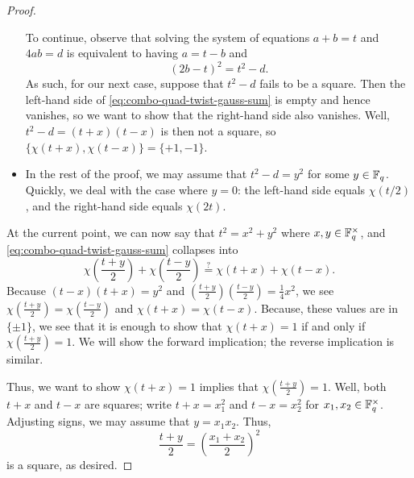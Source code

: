 \begin{proof}
\begin{itemize}
        To continue, observe that solving the system of equations $a+b=t$ and $4ab=d$ is equivalent to having $a=t-b$ and
        \[(2b-t)^2=t^2-d.\]
        As such, for our next case, suppose that $t^2-d$ fails to be a square. Then the left-hand side of \eqref{eq:combo-quad-twist-gauss-sum} is empty and hence vanishes, so we want to show that the right-hand side also vanishes. Well, $t^2-d=(t+x)(t-x)$ is then not a square, so $\{\chi(t+x),\chi(t-x)\}=\{+1,-1\}$.
        \item In the rest of the proof, we may assume that $t^2-d=y^2$ for some $y\in\mathbb F_q$. Quickly, we deal with the case where $y=0$: the left-hand side equals $\chi(t/2)$, and the right-hand side equals $\chi(2t)$.
    \end{itemize}
    At the current point, we can now say that $t^2=x^2+y^2$ where $x,y\in\mathbb F_q^\times$, and \eqref{eq:combo-quad-twist-gauss-sum} collapses into
    \begin{equation*}
        \chi\left(\frac{t+y}2\right)+\chi\left(\frac{t-y}2\right)\stackrel?=\chi(t+x)+\chi(t-x). \label{eq:last-combo-quad-twist-case}
    \end{equation*}
    Because $(t-x)(t+x)=y^2$ and $\left(\frac{t+y}2\right)\left(\frac{t-y}2\right)=\frac14x^2$, we see $\chi\left(\frac{t+y}2\right)=\chi\left(\frac{t-y}2\right)$ and $\chi(t+x)=\chi(t-x)$. Because, these values are in $\{\pm1\}$, we see that it is enough to show that $\chi(t+x)=1$ if and only if $\chi\left(\frac{t+y}2\right)=1$. We will show the forward implication; the reverse implication is similar.

    Thus, we want to show $\chi(t+x)=1$ implies that $\chi\left(\frac{t+y}2\right)=1$. Well, both $t+x$ and $t-x$ are squares; write $t+x=x_1^2$ and $t-x=x_2^2$ for $x_1,x_2\in\mathbb F_q^\times$. Adjusting signs, we may assume that $y=x_1x_2$. Thus,
    \[\frac{t+y}2=\left(\frac{x_1+x_2}2\right)^2\]
    is a square, as desired.
\end{proof}
